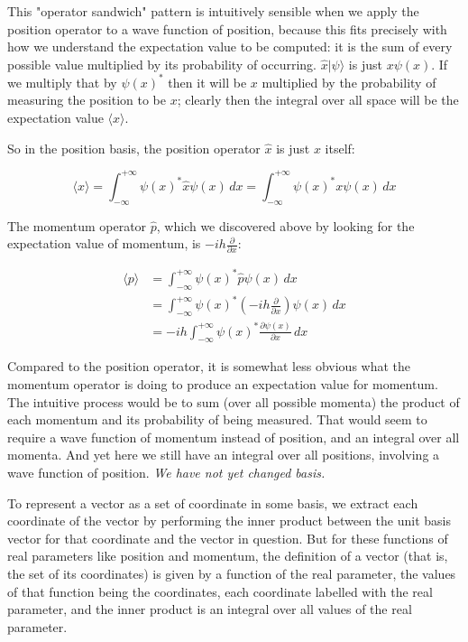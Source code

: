 This "operator sandwich" pattern is intuitively sensible when we apply the position operator to a wave function of position, because this fits precisely with how we understand the expectation value to be computed: it is the sum of every possible value multiplied by its probability of occurring. $\hat{x}|\psi\rangle$ is just $x \psi(x)$. If we multiply that by $\psi(x)^*$ then it will be $x$ multiplied by the probability of measuring the position to be $x$; clearly then the integral over all space will be the expectation value $\langle x \rangle$.

So in the position basis, the position operator $\hat{x}$ is just $x$ itself:

$$
\langle x \rangle =
\int_{-\infty}^{+\infty}
\psi(x)^*
\hat{x}
\psi(x)
\,dx
=
\int_{-\infty}^{+\infty}
\psi(x)^*
x
\psi(x)
\,dx
$$

The momentum operator $\hat{p}$, which we discovered above by looking for the expectation value of momentum, is $-ih\frac{\partial}{\partial x}$:

\begin{equation}
\begin{split}
  \langle p \rangle &=
  \int_{-\infty}^{+\infty}
  \psi(x)^*
  \hat{p}
  \psi(x)
  \,dx 
  \\
  &=
  \int_{-\infty}^{+\infty}
  \psi(x)^*
  (-ih\frac{\partial}{\partial x})
  \psi(x)
  \,dx 
  \\
  &= -ih
  \int_{-\infty}^{+\infty}
  \psi(x)^*
  \frac{\partial \psi(x)}{\partial x}
  \,dx  
\end{split}
\end{equation}

Compared to the position operator, it is somewhat less obvious what the momentum operator is doing to produce an expectation value for momentum. The intuitive process would be to sum (over all possible momenta) the product of each momentum and its probability of being measured. That would seem to require a wave function of momentum instead of position, and an integral over all momenta. And yet here we still have an integral over all positions, involving a wave function of position. \textit{We have not yet changed basis.}

To represent a vector as a set of coordinate in some basis, we extract each coordinate of the vector by performing the inner product between the unit basis vector for that coordinate and the vector in question. But for these functions of real parameters like position and momentum, the definition of a vector (that is, the set of its coordinates) is given by a function of the real parameter, the values of that function being the coordinates, each coordinate labelled with the real parameter, and the inner product is an integral over all values of the real parameter.

